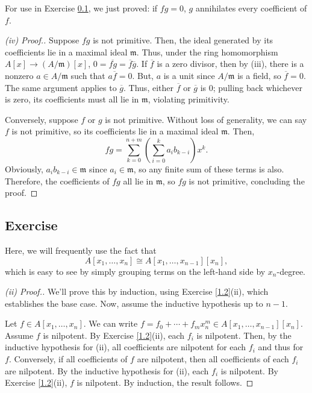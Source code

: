 \begin{remark}
For use in Exercise \ref{1.3}, we just proved: if $fg = 0$, $g$ annihilates every coefficient of $f$.
\end{remark}

\begin{proof}[(iv) Proof.]
Suppose $fg$ is not primitive. Then, the ideal generated by its coefficients lie in a maximal ideal $\mathfrak{m}$.
Thus, under the ring homomorphism $A[x] \to (A/\mathfrak{m})[x]$, $0 = \overline{fg} = \overline{f}\overline{g}$.
If $\overline{f}$ is a zero divisor, then by (iii), there is a nonzero $a \in A/\mathfrak{m}$ such that
$a\overline{f} = 0$. But, $a$ is a unit since $A/\mathfrak{m}$ is a field, so $\overline{f}=0$. The same argument applies
to $\overline{g}$. Thus, either $\overline{f}$ or $\overline{g}$ is $0$; pulling back whichever is zero, its coefficients must
all lie in $\mathfrak{m}$, violating primitivity.

Conversely, suppose $f$ or $g$ is not primitive. Without loss of generality, we can say $f$ is not primitive, so its coefficients lie in
a maximal ideal $\mathfrak{m}$. Then,
$$fg = \sum_{k=0}^{n+m}\left(\sum_{i=0}^ka_ib_{k-i}\right)x^k.$$
Obviously, $a_i b_{k-i} \in \mathfrak{m}$ since $a_i \in \mathfrak{m}$, so any finite sum of these terms is also. Therefore, the coefficients
of $fg$ all lie in $\mathfrak{m}$, so $fg$ is not primitive, concluding the proof.
\end{proof}

\subsection{Exercise}\label{1.3}

Here, we will frequently use the fact that
$$A[x_1,\ldots,x_n] \cong A[x_1,\ldots,x_{n-1}][x_n],$$
which is easy to see by simply grouping terms on the left-hand side by $x_n$-degree.

\begin{proof}[(ii) Proof.]
We'll prove this by induction, using Exercise \ref{1.2}(ii), which establishes the base case. Now, assume the inductive hypothesis up to $n-1$.

Let $f \in A[x_1,\ldots,x_n]$. We can write $f = f_0 + \cdots + f_m x_n^m \in A[x_1,\ldots,x_{n-1}][x_n]$. Assume $f$ is nilpotent. By Exercise \ref{1.2}(ii),
each $f_i$ is nilpotent. Then, by the inductive hypothesis for (ii), all coefficients are nilpotent for each $f_i$ and thus for $f$. Conversely, if all
coefficients of $f$ are nilpotent, then all coefficients of each $f_i$ are nilpotent. By the inductive hypothesis for (ii), each $f_i$ is nilpotent. By
Exercise \ref{1.2}(ii), $f$ is nilpotent. By induction, the result follows.
\end{proof}

